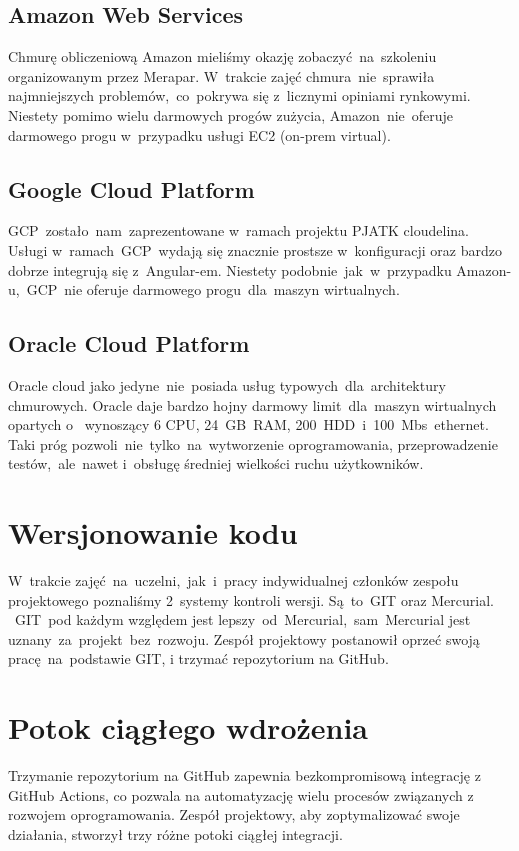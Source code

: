 \subsection{Amazon Web Services}\label{subsec:amazon-web-services}
Chmurę obliczeniową Amazon mieliśmy okazję zobaczyć~na~szkoleniu organizowanym przez Merapar.
W~trakcie zajęć chmura~nie~sprawiła najmniejszych problemów,~co~pokrywa się z~licznymi opiniami rynkowymi.
Niestety pomimo wielu darmowych progów zużycia, Amazon~nie~oferuje darmowego progu w~przypadku usługi EC2 (\gls{on-prem} virtual).

\subsection{Google Cloud Platform}\label{subsec:google-cloud-platform}
GCP~zostało~nam~zaprezentowane w~ramach projektu PJATK cloudelina.
Usługi w~ramach~GCP~wydają się znacznie prostsze w~konfiguracji oraz bardzo dobrze integrują się z~Angular-em.
Niestety podobnie~jak~w~przypadku Amazon-u,~GCP~nie oferuje darmowego progu~dla~maszyn wirtualnych.

\subsection{Oracle Cloud Platform}\label{subsec:oracle-cloud-platform}
Oracle cloud jako jedyne~nie~posiada usług typowych~dla~architektury chmurowych.
Oracle daje bardzo hojny darmowy limit~dla~maszyn wirtualnych opartych o~ wynoszący 6 CPU, 24~GB~RAM, 200~HDD~i~100~Mbs~ethernet.
Taki próg pozwoli~nie~tylko~na~wytworzenie oprogramowania, przeprowadzenie testów,~ale~nawet i~obsługę średniej wielkości ruchu użytkowników.

\section{Wersjonowanie kodu}
\label{sec:wersjonowanie-kodu}

W~trakcie zajęć~na~uczelni,~jak~i~pracy indywidualnej członków zespołu projektowego poznaliśmy 2~systemy kontroli wersji.
Są~to~GIT oraz Mercurial.
~GIT~pod każdym względem jest lepszy~od~Mercurial,~sam~Mercurial jest uznany~za~projekt~bez~rozwoju.
Zespół projektowy postanowił oprzeć swoją pracę~na~podstawie GIT, i trzymać repozytorium na GitHub.

\section{Potok ciągłego wdrożenia}
\label{sec:github-actions}
Trzymanie repozytorium na GitHub zapewnia bezkompromisową integrację z GitHub Actions, co pozwala na automatyzację wielu procesów związanych z rozwojem oprogramowania.
Zespół projektowy, aby zoptymalizować swoje działania, stworzył trzy różne potoki ciągłej integracji.

